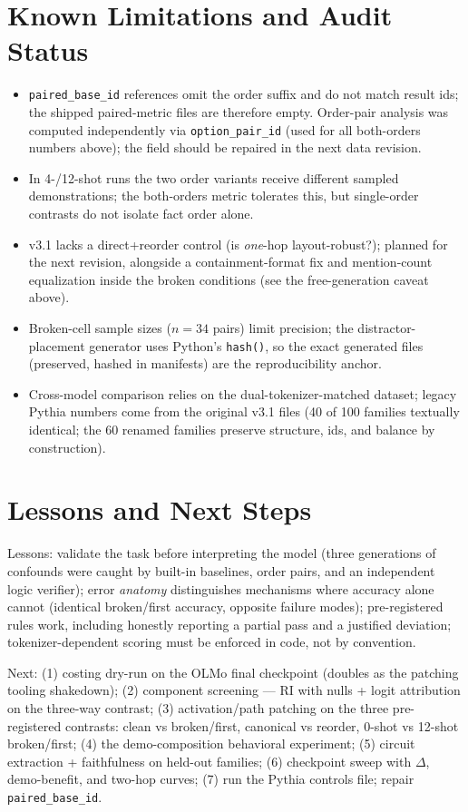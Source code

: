 \documentclass[11pt,a4paper]{article}
\begin{document}
\section{Known Limitations and Audit Status}
\begin{itemize}
\item \texttt{paired\_base\_id} references omit the order suffix and do not match result ids; the shipped paired-metric files are therefore empty. Order-pair analysis was computed independently via \texttt{option\_pair\_id} (used for all both-orders numbers above); the field should be repaired in the next data revision.
\item In 4-/12-shot runs the two order variants receive different sampled demonstrations; the both-orders metric tolerates this, but single-order contrasts do not isolate fact order alone.
\item v3.1 lacks a direct+reorder control (is \emph{one}-hop layout-robust?); planned for the next revision, alongside a containment-format fix and mention-count equalization inside the broken conditions (see the free-generation caveat above).
\item Broken-cell sample sizes ($n{=}34$ pairs) limit precision; the distractor-placement generator uses Python's \texttt{hash()}, so the exact generated files (preserved, hashed in manifests) are the reproducibility anchor.
\item Cross-model comparison relies on the dual-tokenizer-matched dataset; legacy Pythia numbers come from the original v3.1 files (40 of 100 families textually identical; the 60 renamed families preserve structure, ids, and balance by construction).
\end{itemize}

\section{Lessons and Next Steps}
Lessons: validate the task before interpreting the model (three generations of confounds were caught by built-in baselines, order pairs, and an independent logic verifier); error \emph{anatomy} distinguishes mechanisms where accuracy alone cannot (identical broken/first accuracy, opposite failure modes); pre-registered rules work, including honestly reporting a partial pass and a justified deviation; tokenizer-dependent scoring must be enforced in code, not by convention.

Next: (1) costing dry-run on the OLMo final checkpoint (doubles as the patching tooling shakedown); (2) component screening --- RI with nulls + logit attribution on the three-way contrast; (3) activation/path patching on the three pre-registered contrasts: clean vs broken/first, canonical vs reorder, 0-shot vs 12-shot broken/first; (4) the demo-composition behavioral experiment; (5) circuit extraction + faithfulness on held-out families; (6) checkpoint sweep with $\Delta$, demo-benefit, and two-hop curves; (7) run the Pythia controls file; repair \texttt{paired\_base\_id}.
\end{document}
